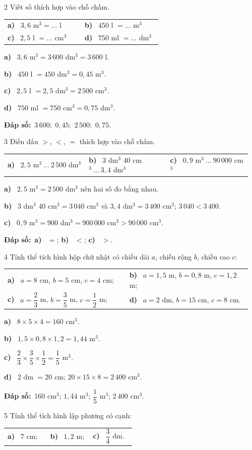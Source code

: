 \documentclass[11pt]{article}
\makeatletter
\newif\ifsol \solfalse
\renewcommand{\arraystretch}{1.35}
\providecommand{\AnsWord}{Đáp số}
\newcommand{\dapso}[1]{\par\textbf{\AnsWord:}\ #1}
\newcommand{\probsol}[1]{%
  \begin{lrbox}{\solmeasure}\begin{minipage}{\dimexpr\linewidth-24pt\relax}#1\end{minipage}\end{lrbox}%
  \ifsol
    \begin{solbox}#1\end{solbox}%
  \else
    \setlength{\solht}{\dimexpr\ht\solmeasure+\dp\solmeasure+0.85cm\relax}%
    \ifdim\solht<1.35cm\setlength{\solht}{1.35cm}\fi
    \begin{tcolorbox}[colback=white,colframe=Line,boxrule=0.8pt,arc=5pt,
      left=8pt,right=8pt,top=4pt,bottom=4pt,height=\solht]{\footnotesize\color{Slate}\itshape\WorkWord}\end{tcolorbox}%
  \fi}
\newcommand{\pa}[1]{\textbf{#1)}\ }
\newenvironment{cols2}{\par\vspace{3pt}\noindent\setlength{\tabcolsep}{0pt}\renewcommand{\arraystretch}{1.3}%
  \begin{tabular}{@{}>{\raggedright\arraybackslash\rule{0pt}{4.4ex}}p{0.48\linewidth}<{\rule[-2.3ex]{0pt}{0pt}}@{\hspace{0.03\linewidth}}>{\raggedright\arraybackslash\rule{0pt}{4.4ex}}p{0.48\linewidth}<{\rule[-2.3ex]{0pt}{0pt}}@{}}}%
  {\end{tabular}\par}
\newenvironment{cols3}{\par\vspace{3pt}\noindent\setlength{\tabcolsep}{0pt}\renewcommand{\arraystretch}{1.3}%
  \begin{tabular}{@{}>{\raggedright\arraybackslash\rule{0pt}{4.4ex}}p{0.32\linewidth}<{\rule[-2.3ex]{0pt}{0pt}}@{\hspace{0.015\linewidth}}>{\raggedright\arraybackslash\rule{0pt}{4.4ex}}p{0.32\linewidth}<{\rule[-2.3ex]{0pt}{0pt}}@{\hspace{0.015\linewidth}}>{\raggedright\arraybackslash\rule{0pt}{4.4ex}}p{0.32\linewidth}<{\rule[-2.3ex]{0pt}{0pt}}@{}}}%
  {\end{tabular}\par}
\newcommand{\gap}{\vspace{0.3cm}}
\def\WorkWord{Bài làm:}
\def\AnsWord{Đáp số}
\makeatother
\begin{document}
\gap
\begin{probbox}{2}{\relax}
Viết số thích hợp vào chỗ chấm.
\begin{cols2}
\pa{a} $3{,}6$ m$^3=\ldots$ l & \pa{b} $450$ l $=\ldots$ m$^3$\\
\pa{c} $2{,}5$ l $=\ldots$ cm$^3$ & \pa{d} $750$ ml $=\ldots$ dm$^3$
\end{cols2}
\end{probbox}
\probsol{
\pa{a} $3{,}6$ m$^3=3\,600$ dm$^3=3\,600$ l.\par
\pa{b} $450$ l $=450$ dm$^3=0{,}45$ m$^3$.\par
\pa{c} $2{,}5$ l $=2{,}5$ dm$^3=2\,500$ cm$^3$.\par
\pa{d} $750$ ml $=750$ cm$^3=0{,}75$ dm$^3$.
\dapso{$3\,600$;\ $0{,}45$;\ $2\,500$;\ $0{,}75$.}}
\gap
\begin{probbox}{3}{\relax}
Điền dấu $>$, $<$, $=$ thích hợp vào chỗ chấm.
\begin{cols3}
\pa{a} $2{,}5$ m$^3\ \ldots\ 2\,500$ dm$^3$ & \pa{b} $3$ dm$^3$ $40$ cm$^3\ \ldots\ 3{,}4$ dm$^3$ & \pa{c} $0{,}9$ m$^3\ \ldots\ 90\,000$ cm$^3$
\end{cols3}
\end{probbox}
\probsol{
\pa{a} $2{,}5$ m$^3=2\,500$ dm$^3$ nên hai số đo bằng nhau.\par
\pa{b} $3$ dm$^3$ $40$ cm$^3=3\,040$ cm$^3$ và $3{,}4$ dm$^3=3\,400$ cm$^3$; $3\,040<3\,400$.\par
\pa{c} $0{,}9$ m$^3=900$ dm$^3=900\,000$ cm$^3>90\,000$ cm$^3$.
\dapso{\pa{a} $=$; \pa{b} $<$; \pa{c} $>$.}}
\gap
\begin{probbox}{4}{\relax}
Tính thể tích hình hộp chữ nhật có chiều dài $a$, chiều rộng $b$, chiều cao $c$:
\begin{cols2}
\pa{a} $a=8$ cm, $b=5$ cm, $c=4$ cm; & \pa{b} $a=1{,}5$ m, $b=0{,}8$ m, $c=1{,}2$ m;\\
\pa{c} $a=\dfrac23$ m, $b=\dfrac35$ m, $c=\dfrac12$ m; & \pa{d} $a=2$ dm, $b=15$ cm, $c=8$ cm.
\end{cols2}
\end{probbox}
\probsol{
\pa{a} $8\times5\times4=160$ cm$^3$.\par
\pa{b} $1{,}5\times0{,}8\times1{,}2=1{,}44$ m$^3$.\par
\pa{c} $\dfrac23\times\dfrac35\times\dfrac12=\dfrac15$ m$^3$.\par
\pa{d} $2$ dm $=20$ cm; $20\times15\times8=2\,400$ cm$^3$.
\dapso{$160$ cm$^3$; $1{,}44$ m$^3$; $\dfrac15$ m$^3$; $2\,400$ cm$^3$.}}
\gap
\begin{probbox}{5}{\relax}
Tính thể tích hình lập phương có cạnh:
\begin{cols3}
\pa{a} $7$ cm; & \pa{b} $1{,}2$ m; & \pa{c} $\dfrac34$ dm.
\end{cols3}
\end{probbox}
\end{document}
